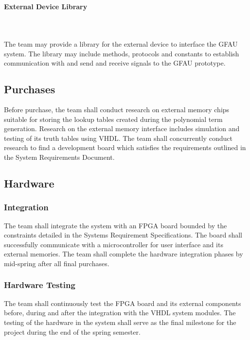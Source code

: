 \documentclass[12pt]{extarticle}
\begin{document}
            \paragraph{External Device Library} \leavevmode \\~\\ The team may
            provide a library for the external device to interface the GFAU
            system. The library may include methods, protocols and constants to
            establish communication with and send and receive signals to the
            GFAU prototype.

        \subsection{Purchases} Before purchase, the team shall conduct research
        on external memory chips suitable for storing the lookup tables created
        during the polynomial term generation. Research on the external memory
        interface includes simulation and testing of its truth tables using
        VHDL. The team shall concurrently conduct research to find a
        development board which satisfies the requirements outlined in the
        System Requirements Document.

        \subsection{Hardware}

            \subsubsection{Integration} The team shall integrate the system
            with an FPGA board bounded by the constraints detailed in the
            Systems Requirement Specifications. The board shall successfully
            communicate with a microcontroller for user interface and its
            external memories. The team shall complete the hardware integration
            phases by mid-spring after all final purchases.

            \subsubsection{Hardware Testing} The team shall continuously test
            the FPGA board and its external components before, during and
            after the integration with the VHDL system modules. The testing of
            the hardware in the system shall serve as the final milestone for
            the project during the end of the spring semester.
\end{document}
